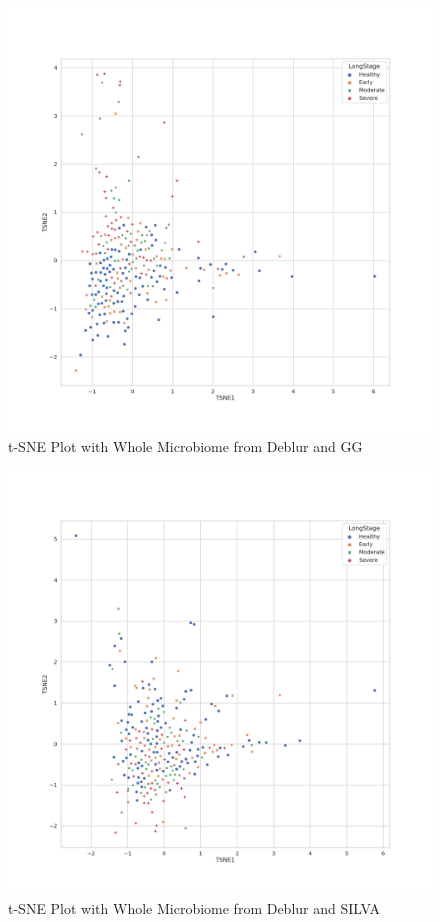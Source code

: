 \documentclass[a4paper]{article}
\begin{document}
            \begin{figure}[p]
                \centering
                \includegraphics[width=0.6 \linewidth]{figures/tSNE/Whole/whole.Deblur.gg.png}
                \caption{t-SNE Plot with Whole Microbiome from Deblur and GG}
                \label{fig:tsne-whole-deblur-gg}
            \end{figure}

            \begin{figure}[p]
                \centering
                \includegraphics[width=0.6 \linewidth]{figures/tSNE/Whole/whole.Deblur.silva.png}
                \caption{t-SNE Plot with Whole Microbiome from Deblur and SILVA}
                \label{fig:tsne-whole-deblur-silva}
            \end{figure}
\end{document}
